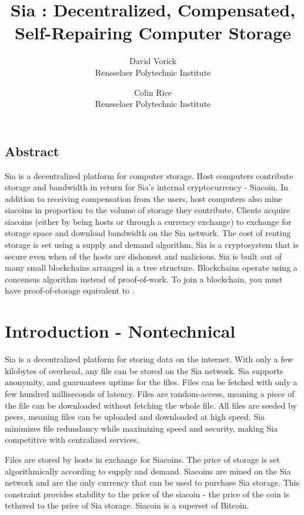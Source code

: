 \documentclass[twocolumn]{article}
\begin{document}
\title{Sia : Decentralized, Compensated, Self-Repairing Computer Storage}

\author{
{\rm David Vorick}\\
Rensselaer Polytechnic Institute
\and
{\rm Colin Rice}\\
Rensselaer Polytechnic Institute
}

\maketitle

\subsection*{Abstract}
Sia is a decentralized platform for computer storage.
Host computers contribute storage and bandwidth in return for Sia's internal cryptocurrency - Siacoin.
In addition to receiving compensation from the users, host computers also mine siacoins in proportion to the volume of storage they contribute.
Clients acquire siacoins (either by being hosts or through a currency exchange) to exchange for storage space and download bandwidth on the Sia network.
The cost of renting storage is set using a supply and demand algorithm.
Sia is a cryptosystem that is secure even when \fortynine \space of the hosts are dishonest and malicious.
Sia is built out of many small blockchains arranged in a tree structure.
Blockchains operate using a concensus algorithm instead of proof-of-work.
To join a blockchain, you must have proof-of-storage equivalent to \storageperhost.

\section{Introduction - Nontechnical}

Sia is a decentralized platform for storing data on the internet.
With only a few kilobytes of overhead, any file can be stored on the Sia network.
Sia supports anonymity, and guaruantees uptime for the files.
Files can be fetched with only a few hundred milliseconds of latency.
Files are random-access, meaning a piece of the file can be downloaded without fetching the whole file.
All files are seeded by \numhosts \space peers, meaning files can be uploaded and downloaded at high speed.
Sia minimizes file redundancy while maximizing speed and security, making Sia competitive with centralized services.

Files are stored by hosts in exchange for Siacoins.
The price of storage is set algorithmically according to supply and demand.
Siacoins are mined on the Sia network and are the only currency that can be used to purchase Sia storage.
This constraint provides stability to the price of the siacoin - the price of the coin is tethered to the price of Sia storage.
Siacoin is a superset of Bitcoin.
\end{document}
